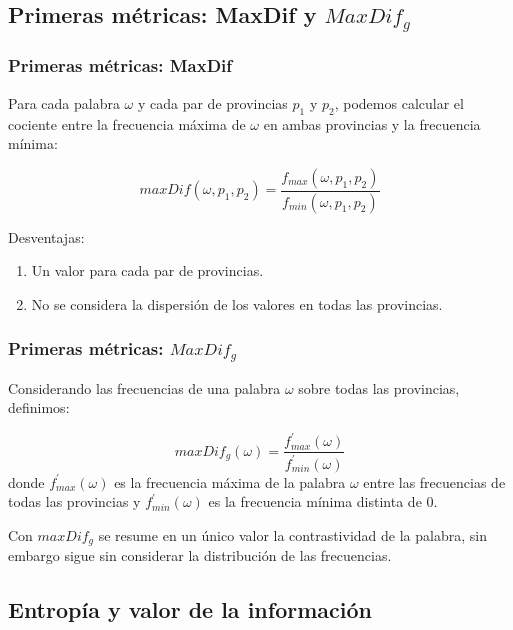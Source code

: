 
\subsection{Primeras métricas: MaxDif y  \texorpdfstring{$MaxDif_g$}{MaxDifg}} 

\begin{frame}[t]\frametitle{Primeras métricas: MaxDif}
Para cada palabra $\omega$ y cada par de provincias $p_1$ y $p_2$, podemos calcular el cociente entre la frecuencia máxima de $\omega$ en ambas provincias y la frecuencia mínima:

\begin{equation}
  \label{eq:maxDif} 
  maxDif(\omega,p_1,p_2) = \frac{f_{max}(\omega,p_1,p_2)}{f_{min}(\omega,p_1,p_2)}
\end{equation}

Desventajas:  
\begin{enumerate}
    \item \label{1} Un valor para cada par de provincias.
    \item \label{2} No se considera la dispersión de los valores en todas las provincias.
\end{enumerate}

\end{frame}

\begin{frame}[t]\frametitle{Primeras métricas: $MaxDif_g$}

Considerando las frecuencias de una palabra $\omega$ sobre todas las provincias, definimos:

\begin{equation}
 maxDif_g(\omega) = \frac{f_{max}^\prime(\omega)}{f_{min}^\prime(\omega)}
 \label{eq:maxDifg}  
\end{equation} 
donde $f_{max}^\prime(\omega)$ es la frecuencia máxima de la palabra $\omega$ entre las frecuencias de todas las provincias y $f_{min}^\prime(\omega)$ es la frecuencia mínima distinta de $0$.

Con $maxDif_g$ se resume en un único valor la contrastividad de la palabra, sin embargo sigue sin considerar la distribución de las frecuencias.


\end{frame}

\subsection{Entropía y valor de la información}

